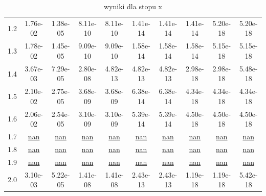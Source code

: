 \begin{table}[h!]
\begin{tabular}{l|c|c|c|c|c|c|c|c|c|}
1.2 & \cellcolor{red!25}1.76e-02 & \cellcolor{red!25}1.38e-05 & \cellcolor{red!25}8.11e-10 & \cellcolor{red!25}8.11e-10 & \cellcolor{red!25}1.41e-14 & \cellcolor{red!25}1.41e-14 & \cellcolor{red!25}1.41e-14 & \cellcolor{red!25}5.20e-18 & \cellcolor{red!25}5.20e-18 \\
1.3 & \cellcolor{red!25}1.78e-02 & \cellcolor{red!25}1.45e-05 & \cellcolor{red!25}9.09e-10 & \cellcolor{red!25}9.09e-10 & \cellcolor{red!25}1.58e-14 & \cellcolor{red!25}1.58e-14 & \cellcolor{red!25}1.58e-14 & \cellcolor{red!25}5.15e-18 & \cellcolor{red!25}5.15e-18 \\
1.4 & \cellcolor{red!25}3.67e-03 & \cellcolor{red!25}7.29e-05 & \cellcolor{red!25}2.80e-08 & \cellcolor{red!25}4.82e-13 & \cellcolor{red!25}4.82e-13 & \cellcolor{red!25}4.82e-13 & \cellcolor{red!25}2.98e-18 & \cellcolor{red!25}2.98e-18 & \cellcolor{red!25}5.48e-18 \\
1.5 & \cellcolor{red!25}2.10e-02 & \cellcolor{red!25}2.75e-05 & \cellcolor{red!25}3.68e-09 & \cellcolor{red!25}3.68e-09 & \cellcolor{red!25}6.38e-14 & \cellcolor{red!25}6.38e-14 & \cellcolor{red!25}4.34e-18 & \cellcolor{red!25}4.34e-18 & \cellcolor{red!25}4.34e-18 \\
1.6 & \cellcolor{red!25}2.06e-02 & \cellcolor{red!25}2.54e-05 & \cellcolor{red!25}3.10e-09 & \cellcolor{red!25}3.10e-09 & \cellcolor{red!25}5.39e-14 & \cellcolor{red!25}5.39e-14 & \cellcolor{red!25}4.50e-18 & \cellcolor{red!25}4.50e-18 & \cellcolor{red!25}4.50e-18 \\
1.7 & \cellcolor{red!25}\underline{nan} & \cellcolor{red!25}\underline{nan} & \cellcolor{red!25}\underline{nan} & \cellcolor{red!25}\underline{nan} & \cellcolor{red!25}\underline{nan} & \cellcolor{red!25}\underline{nan} & \cellcolor{red!25}\underline{nan} & \cellcolor{red!25}\underline{nan} & \cellcolor{red!25}\underline{nan} \\
1.8 & \cellcolor{red!25}\underline{nan} & \cellcolor{red!25}\underline{nan} & \cellcolor{red!25}\underline{nan} & \cellcolor{red!25}\underline{nan} & \cellcolor{red!25}\underline{nan} & \cellcolor{red!25}\underline{nan} & \cellcolor{red!25}\underline{nan} & \cellcolor{red!25}\underline{nan} & \cellcolor{red!25}\underline{nan} \\
1.9 & \cellcolor{red!25}\underline{nan} & \cellcolor{red!25}\underline{nan} & \cellcolor{red!25}\underline{nan} & \cellcolor{red!25}\underline{nan} & \cellcolor{red!25}\underline{nan} & \cellcolor{red!25}\underline{nan} & \cellcolor{red!25}\underline{nan} & \cellcolor{red!25}\underline{nan} & \cellcolor{red!25}\underline{nan} \\
2.0 & \cellcolor{red!25}3.10e-03 & \cellcolor{red!25}5.22e-05 & \cellcolor{red!25}1.41e-08 & \cellcolor{red!25}1.41e-08 & \cellcolor{red!25}2.43e-13 & \cellcolor{red!25}2.43e-13 & \cellcolor{red!25}1.19e-18 & \cellcolor{red!25}1.19e-18 & \cellcolor{red!25}5.42e-18 \\
\bottomrule
\end{tabular}\caption{wyniki dla stopu x}
\end{table}